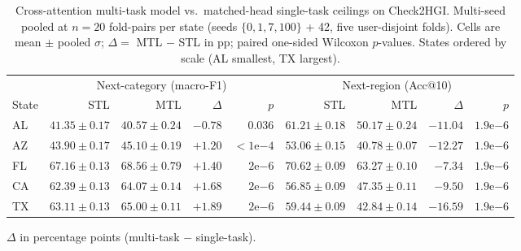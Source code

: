 \begin{table}[t]
\centering
\caption{Cross-attention multi-task model vs.\ matched-head single-task ceilings on Check2HGI. Multi-seed pooled at $n = 20$ fold-pairs per state (seeds $\{0, 1, 7, 100\}$ + 42, five user-disjoint folds). Cells are mean $\pm$ pooled $\sigma$; $\Delta=$ MTL $-$ STL in pp; paired one-sided Wilcoxon $p$-values. States ordered by scale (AL smallest, TX largest).}
\label{tab:mtl-stl}
\scriptsize
\setlength{\tabcolsep}{3pt}
\renewcommand{\arraystretch}{1.1}
\begin{tabular}{l r r r r r r r r}
\toprule
& \multicolumn{4}{c}{Next-category (macro-F1)} & \multicolumn{4}{c}{Next-region (Acc@10)} \\
\cmidrule(lr){2-5} \cmidrule(lr){6-9}
State & STL & MTL & $\Delta$ & $p$ & STL & MTL & $\Delta$ & $p$ \\
\midrule
AL & $41.35\!\pm\!0.17$ & $40.57\!\pm\!0.24$ & $-0.78$ & $0.036$              & $61.21\!\pm\!0.18$ & $50.17\!\pm\!0.24$ & $-11.04$ & $1.9\mathrm{e}{-6}$ \\
AZ & $43.90\!\pm\!0.17$ & $45.10\!\pm\!0.19$ & $+1.20$ & $<\!1\mathrm{e}{-4}$ & $53.06\!\pm\!0.15$ & $40.78\!\pm\!0.07$ & $-12.27$ & $1.9\mathrm{e}{-6}$ \\
FL & $67.16\!\pm\!0.13$ & $68.56\!\pm\!0.79$ & $+1.40$ & $2\mathrm{e}{-6}$    & $70.62\!\pm\!0.09$ & $63.27\!\pm\!0.10$ & $-7.34$  & $1.9\mathrm{e}{-6}$ \\
CA & $62.39\!\pm\!0.13$ & $64.07\!\pm\!0.14$ & $+1.68$ & $2\mathrm{e}{-6}$    & $56.85\!\pm\!0.09$ & $47.35\!\pm\!0.11$ & $-9.50$  & $1.9\mathrm{e}{-6}$ \\
TX & $63.11\!\pm\!0.13$ & $65.00\!\pm\!0.11$ & $+1.89$ & $2\mathrm{e}{-6}$    & $59.44\!\pm\!0.09$ & $42.84\!\pm\!0.14$ & $-16.59$ & $1.9\mathrm{e}{-6}$ \\
\bottomrule
\end{tabular}

\medskip
\scriptsize $\Delta$ in percentage points (multi-task $-$ single-task).
\end{table}
